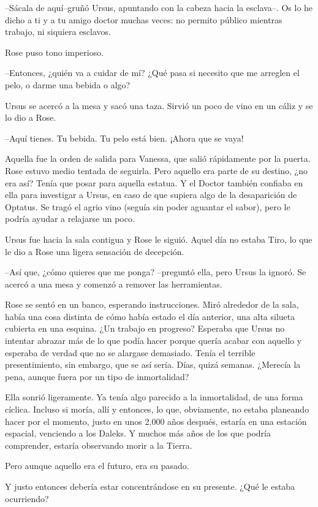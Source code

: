 --Sácala de aquí--gruñó Ursus, apuntando con la cabeza hacia la
esclava--. Os lo he dicho a ti y a tu amigo doctor muchas veces: no
permito público mientras trabajo, ni siquiera esclavos.

Rose puso tono imperioso.

--Entonces, ¿quién va a cuidar de mí? ¿Qué pasa si necesito que me
arreglen el pelo, o darme una bebida o algo?

Ursus se acercó a la mesa y sacó una taza. Sirvió un poco de vino en un
cáliz y se lo dio a Rose.

--Aquí tienes. Tu bebida. Tu pelo está bien. ¡Ahora que se vaya!

Aquella fue la orden de salida para Vanessa, que salió rápidamente por
la puerta. Rose estuvo medio tentada de seguirla. Pero aquello era parte
de su destino, ¿no era así? Tenía que posar para aquella estatua. Y el
Doctor también confiaba en ella para investigar a Ursus, en caso de que
supiera algo de la desaparición de Optatus. Se tragó el agrio vino
(seguía sin poder aguantar el sabor), pero le podría ayudar a relajarse
un poco.

Ursus fue hacia la sala contigua y Rose le siguió. Aquel día no estaba
Tiro, lo que le dio a Rose una ligera sensación de decepción.

--Así que, ¿cómo quieres que me ponga? --preguntó ella, pero Ursus la
ignoró. Se acercó a una mesa y comenzó a remover las herramientas.

Rose se sentó en un banco, esperando instrucciones. Miró alrededor de la
sala, había una cosa distinta de cómo había estado el día anterior, una
alta silueta cubierta en una esquina. ¿Un trabajo en progreso? Esperaba
que Ursus no intentar abrazar más de lo que podía hacer porque quería
acabar con aquello y esperaba de verdad que no se alargase demasiado.
Tenía el terrible presentimiento, sin embargo, que se así sería. Días,
quizá semanas. ¿Merecía la pena, aunque fuera por un tipo de
inmortalidad?

Ella sonrió ligeramente. Ya tenía algo parecido a la inmortalidad, de
una forma cíclica. Incluso si moría, allí y entonces, lo que,
obviamente, no estaba planeando hacer por el momento, justo en unos
2.000 años después, estaría en una estación espacial, venciendo a los
Daleks. Y muchos más años de los que podría comprender, estaría
observando morir a la Tierra.

Pero aunque aquello era el futuro, era su pasado.

Y justo entonces debería estar concentrándose en su presente. ¿Qué le
estaba ocurriendo?

